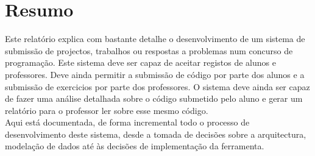 \thispagestyle{plain}
\chapter*{Resumo}

Este relatório explica com bastante detalhe o desenvolvimento de um sistema de submissão de projectos, trabalhos ou respostas a problemas num concurso de programação.
Este sistema deve ser capaz de aceitar registos de alunos e professores. Deve ainda permitir a submissão
de código por parte dos alunos e a submissão de exercicios por parte dos professores. O sistema deve ainda ser capaz de fazer uma análise detalhada
sobre o código submetido pelo aluno e gerar um relatório para o professor ler sobre esse mesmo código.\\

Aqui está documentada, de forma incremental todo o processo de desenvolvimento deste sistema, desde a tomada de decisões sobre a arquitectura, modelação de dados até
às decisões de implementação da ferramenta.


